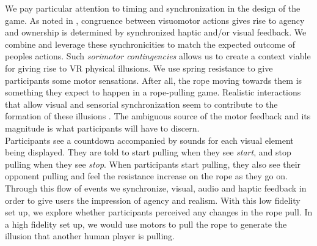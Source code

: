 We pay particular attention to timing and synchronization in the design of the game. As noted in \cite{kilteni2012sense}, congruence between visuomotor actions gives rise to agency and ownership is determined by synchronized haptic and/or visual feedback. We combine and leverage these synchronicities to match the expected outcome of peoples actions. Such \textit{sorimotor contingencies} \cite{slater2009place} allows us to create a context viable for giving rise to VR physical illusions. We use spring resistance to give participants some motor sensations. After all, the rope moving towards them is something they expect to happen in a rope-pulling game. Realistic interactions that allow visual and sensorial synchronization seem to contribute to the formation of these illusions \cite{slater2009place}. The ambiguous source of the motor feedback and its magnitude is what participants will have to discern.
\\
Participants see a countdown accompanied by sounds for each visual element being displayed. They are told to start pulling when they see \textit{start}, and stop pulling when they see \textit{stop}. When participants start pulling, they also see their opponent pulling and feel the resistance increase on the rope as they go on. Through this flow of events we synchronize, visual, audio and haptic feedback in order to give users the impression of agency and realism. With this low fidelity set up, we explore whether participants perceived any changes in the rope pull. In a high fidelity set up, we would use motors to pull the rope to generate the illusion that another human player is pulling. 